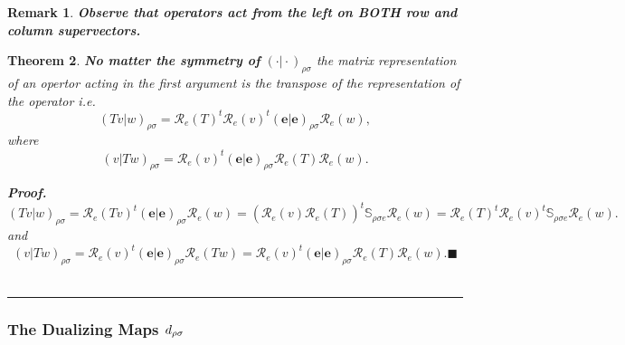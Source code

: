 \documentclass[aps,preprint]{revtex4}
\newtheorem{theorem}{Theorem}
\newtheorem{remark}[theorem]{Remark}
\newenvironment{proof}[1][Proof]{\noindent\textbf{#1.} }{\ \rule{0.5em}{0.5em}}
\begin{document}
\begin{remark}
\textbf{Observe that operators act from the left on BOTH row and column
supervectors.}
\end{remark}

\begin{theorem}
\textbf{No matter the symmetry of } $\left( \left. \cdot \right\vert \cdot
\right) _{\rho \sigma }$ the matrix representation of an opertor acting in
the first argument is the transpose of the representation of the operator
i.e. 
\begin{equation}
\left( \left. Tv\right\vert w\right) _{\rho \sigma }=\mathcal{R}_{e}\left(
T\right) ^{t}\mathcal{R}_{e}\left( v\right) ^{t}\left( \left. \mathbf{e}%
\right\vert \mathbf{e}\right) _{\rho \sigma }\mathcal{R}_{e}\left( w\right) ,
\end{equation}%
where 
\begin{equation}
\left( \left. v\right\vert Tw\right) _{\rho \sigma }=\mathcal{R}_{e}\left(
v\right) ^{t}\left( \left. \mathbf{e}\right\vert \mathbf{e}\right) _{\rho
\sigma }\mathcal{R}_{e}\left( T\right) \mathcal{R}_{e}\left( w\right) .
\end{equation}

\begin{proof}
\begin{equation}
\left( \left. Tv\right\vert w\right) _{\rho \sigma }=\mathcal{R}_{e}\left(
Tv\right) ^{t}\left( \left. \mathbf{e}\right\vert \mathbf{e}\right) _{\rho
\sigma }\mathcal{R}_{e}\left( w\right) =\left( \overset{}{\mathcal{R}%
_{e}\left( v\right) \mathcal{R}_{e}\left( T\right) }\right) ^{t}\mathbb{S}%
_{\rho \sigma e}\mathcal{R}_{e}\left( w\right) =\mathcal{R}_{e}\left(
T\right) ^{t}\mathcal{R}_{e}\left( v\right) ^{t}\mathbb{S}_{\rho \sigma e}%
\mathcal{R}_{e}\left( w\right) .
\end{equation}%
and 
\begin{equation}
\left( \left. v\right\vert Tw\right) _{\rho \sigma }=\mathcal{R}_{e}\left(
v\right) ^{t}\left( \left. \mathbf{e}\right\vert \mathbf{e}\right) _{\rho
\sigma }\mathcal{R}_{e}\left( Tw\right) =\mathcal{R}_{e}\left( v\right)
^{t}\left( \left. \mathbf{e}\right\vert \mathbf{e}\right) _{\rho \sigma }%
\mathcal{R}_{e}\left( T\right) \mathcal{R}_{e}\left( w\right) .\blacksquare
\end{equation}
\end{proof}
\end{theorem}

\subsubsection{\textbf{The Dualizing Maps }$d_{\protect\rho \protect\sigma }$
\textbf{\label{dualizing map}}}
\end{document}
